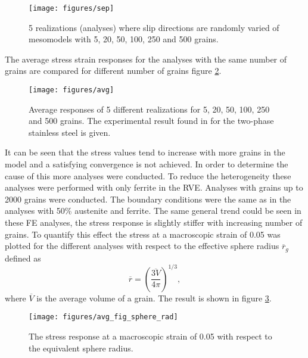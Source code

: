 \documentclass[crystal_plast.tex]{subfiles}
\begin{document}
 \begin{figure}[ht]
\centering
\texttt{[image: figures/sep]}
\caption{5 realizations (analyses) where slip directions are randomly varied of mesomodels with 5, 20, 50, 100, 250 and 500 grains.}
\label{fig:sep}
\end{figure}

The average stress strain responses for the analyses with the same number of grains are compared for different number of grains figure \ref{fig:avg}.

\begin{figure}[htpb!]
\centering
\texttt{[image: figures/avg]}
\caption{Average responses of 5 different realizations for 5, 20, 50, 100, 250 and 500 grains. The experimental result found in \cite{lillekh} for the two-phase stainless steel is given.}
\label{fig:avg}
\end{figure}

It can be seen that the stress values tend to increase with more grains in the model and a satisfying convergence is not achieved. In order to determine the cause of this more analyses were conducted. To reduce the heterogeneity these analyses were performed with only ferrite in the RVE. Analyses with grains up to 2000 grains were conducted. The boundary conditions were the same as in the analyses with 50\% austenite and ferrite. The same general trend could be seen in these FE analyses, the stress response is slightly stiffer with increasing number of grains. To quantify this effect the stress at a macroscopic strain of 0.05 was plotted for the different analyses with respect to the effective sphere radius $\overline{r}_g$ defined as
\begin{equation}
 \overline{r} = \left( \frac{ \overline{3V}}{4 \pi} \right)^{1/3},
\end{equation}
where $\overline{V}$ is the average volume of a grain. The result is shown in figure \ref{fig:avg_sphere_rad}.


\begin{figure}[htpb!]
\centering
\texttt{[image: figures/avg\_fig\_sphere\_rad]}
\caption{The stress response at a macroscopic strain of 0.05 with respect to the equivalent sphere radius.}
\label{fig:avg_sphere_rad}
\end{figure}
\end{document}
